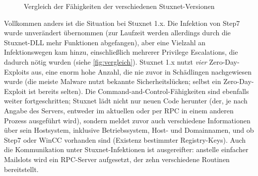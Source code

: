 \documentclass[a4paper]{article}
\begin{document}
\begin{figure}
  \centering
  
  \caption{Vergleich der Fähigkeiten der verschiedenen Stuxnet-Versionen\label{fig:vergleich}}
\end{figure}

Vollkommen anders ist die Situation bei Stuxnet 1.x.
Die Infektion von Step7 wurde unverändert übernommen (zur Laufzeit werden allerdings durch die Stuxnet-DLL mehr Funktionen abgefangen),
aber eine Vielzahl an Infektionswegen kam hinzu, einschließlich mehrerer Privilege Escalations, die dadurch nötig wurden (siehe \autoref{fig:vergleich}).
Stuxnet 1.x nutzt \emph{vier} Zero-Day-Exploits aus, eine enorm hohe Anzahl, die nie zuvor in Schädlingen nachgewiesen wurde
(die meiste Malware nutzt bekannte Sicherheitslücken; selbst ein Zero-Day-Exploit ist bereits selten).
Die Command-and-Control-Fähigkeiten sind ebenfalls weiter fortgeschritten;
Stuxnet lädt nicht nur neuen Code herunter (der, je nach Angabe des Servers, entweder im aktuellen oder per RPC in einem anderen Prozess ausgeführt wird),
sondern meldet zuvor auch verschiedene Informationen über sein Hostsystem,
inklusive Betriebssystem, Host- und Domainnamen, und ob Step7 oder WinCC vorhanden sind (Existenz bestimmter Registry-Keys).
Auch die Kommunikation unter Stuxnet-Infektionen ist ausgereifter:
anstelle einfacher Mailslots wird ein RPC-Server aufgesetzt, der zehn verschiedene Routinen bereitstellt. %
\end{document}
